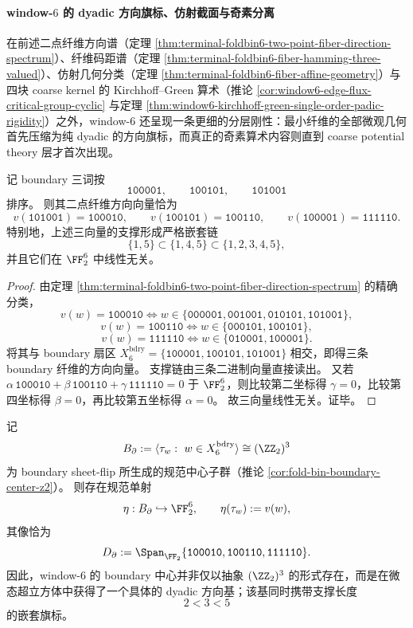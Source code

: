 \paragraph{window-\(6\) 的 dyadic 方向旗标、仿射截面与奇素分离}
在前述二点纤维方向谱（定理 \ref{thm:terminal-foldbin6-two-point-fiber-direction-spectrum}）、纤维码距谱（定理 \ref{thm:terminal-foldbin6-fiber-hamming-three-valued}）、仿射几何分类（定理 \ref{thm:terminal-foldbin6-fiber-affine-geometry}）与四块 coarse kernel 的 Kirchhoff--Green 算术（推论 \ref{cor:window6-edge-flux-critical-group-cyclic} 与定理 \ref{thm:window6-kirchhoff-green-single-order-padic-rigidity}）之外，window-\(6\) 还呈现一条更细的分层刚性：最小纤维的全部微观几何首先压缩为纯 dyadic 的方向旗标，而真正的奇素算术内容则直到 coarse potential theory 层才首次出现。

\begin{theorem}\label{thm:window6-boundary-dyadic-direction-flag}
记 boundary 三词按
\[
\texttt{100001},\qquad \texttt{100101},\qquad \texttt{101001}
\]
排序。
则其二点纤维方向向量恰为
\[
v(\texttt{101001})=\texttt{100010},\qquad
v(\texttt{100101})=\texttt{100110},\qquad
v(\texttt{100001})=\texttt{111110}.
\]
特别地，上述三向量的支撑形成严格嵌套链
\[
\{1,5\}\subset \{1,4,5\}\subset \{1,2,3,4,5\},
\]
并且它们在 \(\FF_2^6\) 中线性无关。
\end{theorem}

\begin{proof}
由定理 \ref{thm:terminal-foldbin6-two-point-fiber-direction-spectrum} 的精确分类，
\[
v(w)=\texttt{100010}\iff
w\in\{\texttt{000001},\texttt{001001},\texttt{010101},\texttt{101001}\},
\]
\[
v(w)=\texttt{100110}\iff
w\in\{\texttt{000101},\texttt{100101}\},
\]
\[
v(w)=\texttt{111110}\iff
w\in\{\texttt{010001},\texttt{100001}\}.
\]
将其与 boundary 扇区
\(
X_6^{\mathrm{bdry}}=\{\texttt{100001},\texttt{100101},\texttt{101001}\}
\)
相交，即得三条 boundary 纤维的方向向量。
支撑链由三条二进制向量直接读出。
又若
\(
\alpha\,\texttt{100010}+\beta\,\texttt{100110}+\gamma\,\texttt{111110}=0
\)
于 \(\FF_2^6\)，则比较第二坐标得 \(\gamma=0\)，比较第四坐标得 \(\beta=0\)，再比较第五坐标得 \(\alpha=0\)。
故三向量线性无关。证毕。
\end{proof}

\begin{corollary}\label{cor:window6-boundary-center-direction-realization}
记
\[
B_{\partial}:=\langle \tau_w:\ w\in X_6^{\mathrm{bdry}}\rangle\cong (\ZZ_2)^3
\]
为 boundary sheet-flip 所生成的规范中心子群（推论 \ref{cor:fold-bin-boundary-center-z2}）。
则存在规范单射
\[
\eta:B_{\partial}\hookrightarrow \FF_2^6,
\qquad
\eta(\tau_w):=v(w),
\]
其像恰为
\[
D_{\partial}:=\Span_{\FF_2}\{\texttt{100010},\texttt{100110},\texttt{111110}\}.
\]
因此，window-\(6\) 的 boundary 中心并非仅以抽象 \((\ZZ_2)^3\) 的形式存在，而是在微态超立方体中获得了一个具体的 dyadic 方向基；该基同时携带支撑长度
\[
2<3<5
\]
的嵌套旗标。
\end{corollary}

